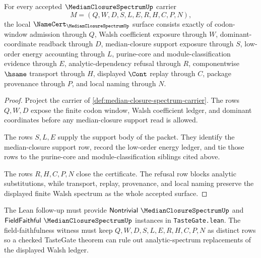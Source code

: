 \begin{theorem}
\label{thm:median-closure-spectrum-namecert-obligations}
For every accepted $\MedianClosureSpectrumUp$ carrier
$$
M=(Q,W,D,S,L,E,R,H,C,P,N),
$$
the local $\NameCert_{\MedianClosureSpectrumUp}$ surface consists exactly of codon-window admission through $Q$, Walsh coefficient exposure through $W$, dominant-coordinate readback through $D$, median-closure support exposure through $S$, low-order energy accounting through $L$, purine-core and module-classification evidence through $E$, analytic-dependency refusal through $R$, componentwise $\hsame$ transport through $H$, displayed $\Cont$ replay through $C$, package provenance through $P$, and local naming through $N$.
\end{theorem}
\begin{proof}
Project the carrier of \autoref{def:median-closure-spectrum-carrier}. The rows $Q,W,D$ expose the finite codon window, Walsh coefficient ledger, and dominant coordinates before any median-closure support read is allowed.

The rows $S,L,E$ supply the support body of the packet. They identify the median-closure support row, record the low-order energy ledger, and tie those rows to the purine-core and module-classification siblings cited above.

The rows $R,H,C,P,N$ close the certificate. The refusal row blocks analytic substitutions, while transport, replay, provenance, and local naming preserve the displayed finite Walsh spectrum as the whole accepted surface.
\end{proof}



The Lean follow-up must provide $\mathsf{Nontrivial}\ \MedianClosureSpectrumUp$ and $\mathsf{FieldFaithful}\ \MedianClosureSpectrumUp$ instances in \texttt{TasteGate.lean}. The field-faithfulness witness must keep $Q,W,D,S,L,E,R,H,C,P,N$ as distinct rows so a checked TasteGate theorem can rule out analytic-spectrum replacements of the displayed Walsh ledger.

